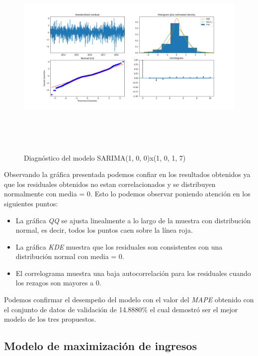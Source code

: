 \begin{figure}[H]
  \centering
      \includegraphics[width=\maxwidth,height=10cm]{figures/sarimax_summary.png}  
  \caption{Diagnóstico del modelo SARIMA(1, 0, 0)x(1, 0, 1, 7)}
\end{figure}


Observando la gráfica presentada podemos confiar en los resultados obtenidos ya que los residuales obtenidos no estan correlacionados y se distribuyen normalmente con media = 0. Esto lo podemos observar poniendo atención en los siguientes puntos:

\begin{itemize}
  \item La gráfica \emph{QQ} se ajusta linealmente a lo largo de la muestra con distribución normal, es decir, todos los puntos caen sobre la línea roja.
  \item La gráfica \emph{KDE} muestra que los residuales son consistentes con una distribución normal con media = 0.
  \item El correlograma muestra una baja autocorrelación para los residuales cuando los rezagos son mayores a 0.
\end{itemize}

Podemos confirmar el desempeño del modelo con el valor del \emph{MAPE} obtenido con el conjunto de datos de validación de 14.8880\% el cual demostró ser el mejor modelo de los tres propuestos.

\subsection*{Modelo de maximización de ingresos}

